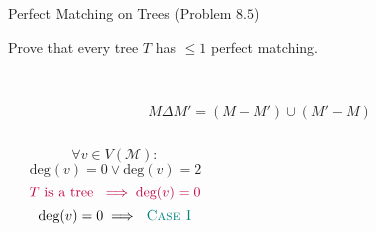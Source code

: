 \begin{frame}{}
  \begin{exampleblock}{Perfect Matching on Trees (Problem $8.5$)}
    \begin{center}
      Prove that every tree $T$ has $\le 1$ perfect matching.
    \end{center}
  \end{exampleblock}

  \begin{center}
     \\[6pt]
  \end{center}

  \pause
  \vspace{-0.30cm}
  \[
    M \Delta M' = (M - M') \cup (M' - M)
  \]
  \begin{center}
  \end{center}

  \begin{columns}
      \pause
      \begin{columns}
	  \vspace{-0.20cm}
	  \centerline{}
	  \vspace{-0.20cm}
	  \centerline{}
      \end{columns}
      \pause
      \[
	\forall v \in V(\mathcal{M}):
      \]
      \[
	\text{deg}(v) = 0 \lor \text{deg}(v) = 2
      \]
      \pause
      \vspace{-0.50cm}
      \[
	\textcolor{purple}{T \text{ is a tree } \implies \text{deg}(v) = 0}
      \]
      \pause
      \vspace{-0.50cm}
      \[
	\text{deg}(v) = 0 \implies \text{\textcolor{teal}{\textsc{ Case I}}}
      \]
  \end{columns}
\end{frame}

